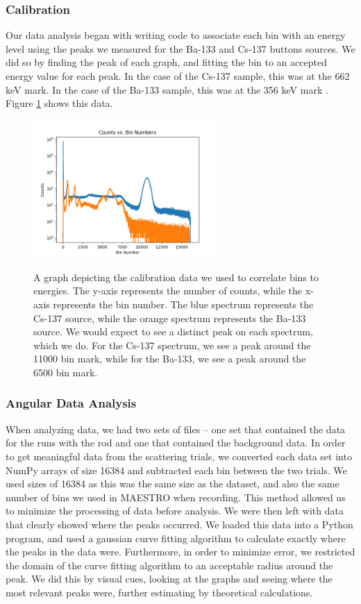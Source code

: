 \documentclass[10pt,letterpaper,onecolumn]{article}
\begin{document}
\subsubsection*{Calibration}
Our data analysis began with writing code to associate each bin with an energy level using the peaks we measured for the Ba-133 and Cs-137 buttons sources. We did so by finding the peak of each graph, and fitting the bin to an accepted energy value for each peak. In the case of the Cs-137 sample, this was at the 662 keV mark\cite{GammaSpectacularCS137}. In the case of the Ba-133 sample, this was at the 356 keV mark \cite{GammaSpectacularBA133}. Figure \ref{fig:calibration} shows this data. 
\begin{figure}[hbt!]
    \begin{center}
        {{\includegraphics[width=7cm]{calib.png} }}%
        \caption{A graph depicting the calibration data we used to correlate bins to energies. The y-axis represents the number of counts, while the x-axis represents the bin number. The blue spectrum represents the Cs-137 source, while the orange spectrum represents the Ba-133 source. We would expect to see a distinct peak on each spectrum, which we do. For the Cs-137 spectrum, we see a peak around the 11000 bin mark, while for the Ba-133, we see a peak around the 6500 bin mark.}%
        \label{fig:calibration}%
    \end{center}
\end{figure}
\subsubsection*{Angular Data Analysis}
When analyzing data, we had two sets of files -- one set that contained the data for the runs with the rod and one that contained the background data. In order to get meaningful data from the scattering trials, we converted each data set into NumPy arrays of size 16384 and subtracted each bin between the two trials. We used sizes of 16384 as this was the same size as the dataset, and also the same number of bins we used in MAESTRO when recording. This method allowed us to minimize the processing of data before analysis. We were then left with data that clearly showed where the peaks occurred. We loaded this data into a Python program, and used a gaussian curve fitting algorithm to calculate exactly where the peaks in the data were. Furthermore, in order to minimize error, we restricted the domain of the curve fitting algorithm to an acceptable radius around the peak. We did this by visual cues, looking at the graphs and seeing where the most relevant peaks were, further estimating by theoretical calculations.
\end{document}
